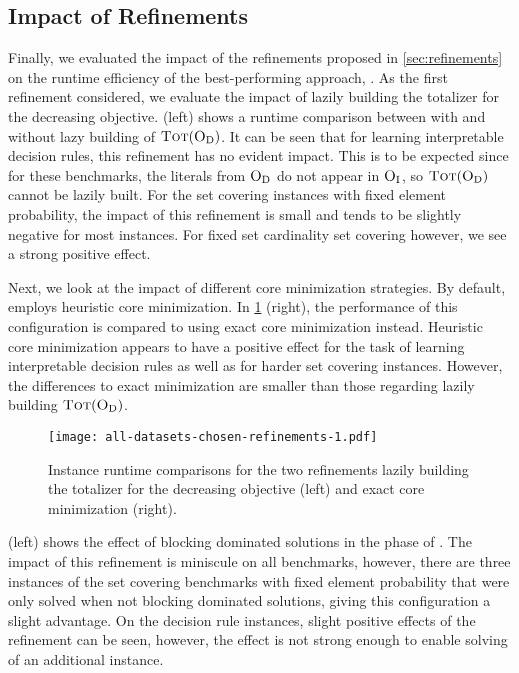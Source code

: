 \subsection{Impact of Refinements\label{sec:res-ref}}

Finally, we evaluated the impact of the refinements proposed in \cref{sec:refinements} on the runtime efficiency of the best-performing approach, \msh{}.
As the first refinement considered, we evaluate the impact of lazily building the totalizer for the decreasing objective.
 (left) shows a runtime comparison between \msh{} with and without lazy building of $\textsc{Tot}(\textsc{O}_{\text{D}})$.
It can be seen that for learning interpretable decision rules, this refinement has no evident impact.
This is to be expected since for these benchmarks, the literals from $\textsc{O}_{\text{D}}$ do not appear in $\textsc{O}_{\text{I}}$, so $\textsc{Tot}(\textsc{O}_{\text{D}})$ cannot be lazily built.
For the set covering instances with fixed element probability, the impact of this refinement is small and tends to be slightly negative for most instances.
For fixed set cardinality set covering however, we see a strong positive effect.

Next, we look at the impact of different core minimization strategies.
By default, \msh{} employs heuristic core minimization.
In \cref{fig:refinements-1} (right), the performance of this configuration is compared to using exact core minimization instead.
Heuristic core minimization appears to have a positive effect for the task of learning interpretable decision rules as well as for harder set covering instances.
However, the differences to exact minimization are smaller than those regarding lazily building $\textsc{Tot}(\textsc{O}_{\text{D}})$.

\begin{figure}
    \centering
    \texttt{[image: all-datasets-chosen-refinements-1.pdf]}
    \caption{Instance runtime comparisons for the two refinements lazily building the totalizer for the decreasing objective (left) and exact core minimization (right).}\label{fig:refinements-1}
\end{figure}

 (left) shows the effect of blocking dominated solutions in the \satunsat{} phase of \msh{}.
The impact of this refinement is miniscule on all benchmarks, however, there are three instances of the set covering benchmarks with fixed element probability that were only solved when not blocking dominated solutions, giving this configuration a slight advantage.
On the decision rule instances, slight positive effects of the refinement can be seen, however, the effect is not strong enough to enable solving of an additional instance.

